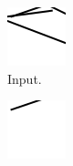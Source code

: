 \begin{figure}
    \centering
    \begin{subfigure}{.15\textwidth}
        \includegraphics[width=\textwidth]{graphics/work-artifacts/iterative/full/2/process/test.png}
        \caption{Input.}
    \end{subfigure}
    \begin{subfigure}{.15\textwidth}
        \includegraphics[width=\textwidth]{graphics/work-artifacts/iterative/full/2/process/test-0.png}

\end{subfigure}
\end{figure}
